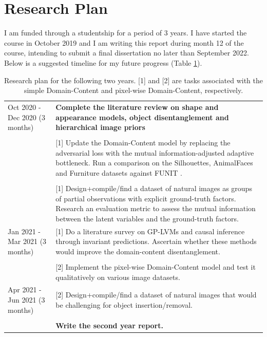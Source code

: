 \documentclass[withindex,glossary,firstyr,times]{cam-thesis}
\begin{document}

\section{Research Plan}

I am funded through a studentship for a period of 3 years. I have started the course in October 2019 and I am writing this report during month 12 of the course, intending to submit a final dissertation no later than September 2022. Below is a suggested timeline for my future progress (Table \ref{tab:timetable}).

\begin{table}
  \centering
  \caption{Research plan for the following two years. [1] and [2] are tasks associated with the simple Domain-Content and pixel-wise Domain-Content, respectively.}
  \label{tab:timetable}
  \begin{tabular}{p{}p{}}
    \toprule
    Oct 2020 - Dec 2020 (3 months) & \textbf{Complete the literature review on shape and appearance models, object disentanglement and hierarchical image priors} \\ & \\ & [1] Update the Domain-Content model by replacing the adversarial loss with the mutual information-adjusted adaptive bottleneck. Run a comparison on the Silhouettes, AnimalFaces and Furniture datasets against FUNIT \cite{liu2019few}. \\ & \\ & [1] Design+compile/find a dataset of natural images as groups of partial observations with explicit ground-truth factors. Research an evaluation metric to assess the mutual information between the latent variables and the ground-truth factors. \\
    \midrule
    Jan 2021 - Mar 2021 (3 months) & [1] Do a literature survey on GP-LVMs and causal inference through invariant predictions. Ascertain whether these methods would improve the domain-content disentanglement. \\ & \\ & [2] Implement the pixel-wise Domain-Content model and test it qualitatively on various image datasets. \\
    \midrule
    Apr 2021 - Jun 2021 (3 months) & [2] Design+compile/find a dataset of natural images that would be challenging for object insertion/removal. \\ & \\ & \textbf{Write the second year report.} \\

\end{tabular}
\end{table}
\end{document}
